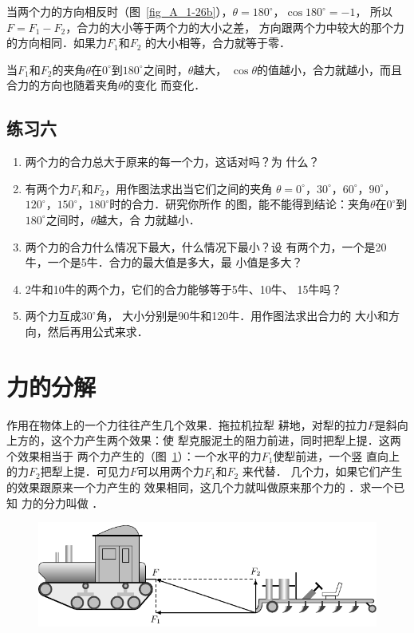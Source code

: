     当两个力的方向相反时（图~\ref{fig_A_1-26b}），$\theta =180^\circ$，$\cos 180^\circ=-1$，
所以$F=F_1-F_2$，合力的大小等于两个力的大小之差，
方向跟两个力中较大的那个力的方向相同．如果力$F_1$和$F_2$
的大小相等，合力就等于零．

    当$F_1$和$F_2$的夹角$\theta$在$0^\circ$到$180^\circ$之间时，$\theta$越大，
$\cos\theta$的值越小，合力就越小，而且合力的方向也随着夹角$\theta$的变化
而变化．


\subsection*{练习六} 
\begin{enumerate} 
\item 两个力的合力总大于原来的每一个力，这话对吗？为
什么？

\item 有两个力$F_1$和$F_2$，用作图法求出当它们之间的夹角
$\theta =0^\circ$，$30^\circ$，$60^\circ$，$90^\circ$，$120^\circ$，$150^\circ$，$180^\circ$时的合力．研究你所作
的图，能不能得到结论：夹角$\theta$在$0^\circ$到$180^\circ$之间时，$\theta $越大，合
力就越小．
\item 两个力的合力什么情况下最大，什么情况下最小？设
有两个力，一个是20牛，一个是5牛．合力的最大值是多大，最
小值是多大？
\item 2牛和10牛的两个力，它们的合力能够等于5牛、10牛、
15牛吗？
\item   两个力互成$30^\circ$角， 大小分别是90牛和120牛．用作图法求出合力的
大小和方向，然后再用公式来求．
\end{enumerate} 
    
\section{力的分解} 
作用在物体上的一个力往往产生几个效果．拖拉机拉犁
耕地，对犁的拉力$F$是斜向上方的，这个力产生两个效果：使
犁克服泥土的阻力前进，同时把犁上提．这两个效果相当于
两个力产生的（图~\ref{fig_A_1-27}）：一个水平的力$F_1$使犁前进，一个竖
直向上的力$F_2$把犁上提．可见力$F$可以用两个力$F_1$和$F_2$
来代替．
几个力，如果它们产生的效果跟原来一个力产生的
效果相同，这几个力就叫做原来那个力的 ．求一个已知
力的分力叫做 ．

\begin{figure}[htbp]
    \centering
    \includegraphics{fig/A/1-27.pdf} 
    \caption{} \label{fig_A_1-27} 
\end{figure} 

